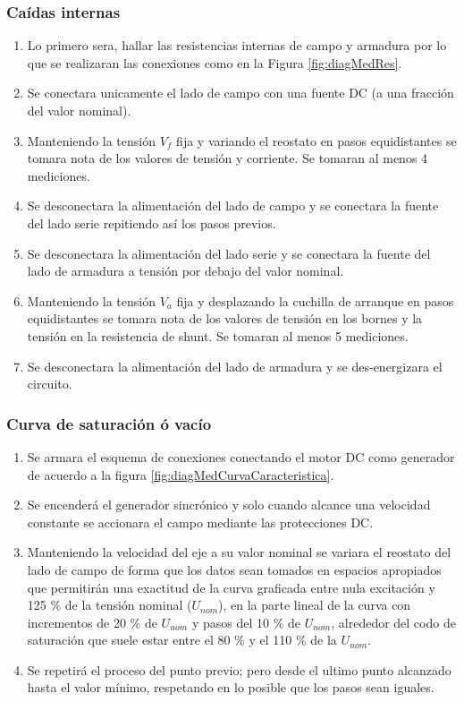 \documentclass[11pt,letterpaper]{article}     %
\begin{document}
\subsubsection{Caídas internas}
\begin{enumerate}
    \item Lo primero sera, hallar las resistencias internas de campo y armadura por lo que se realizaran las conexiones como en la Figura \ref{fig:diagMedRes}.
    \item Se conectara unicamente el lado de campo con una fuente DC (a una fracción del valor nominal).
    \item Manteniendo la tensión $V_{f}$ fija y variando el reostato en pasos equidistantes se tomara nota de los valores de tensión y corriente. Se tomaran al menos 4 mediciones.
    \item Se desconectara la alimentación del lado de campo y se conectara la fuente del lado serie repitiendo así los pasos previos.
    \item Se desconectara la alimentación del lado serie y se conectara la fuente del lado de armadura a tensión por debajo del valor nominal.
    \item Manteniendo la tensión $V_{a}$ fija y desplazando la cuchilla de arranque en pasos equidistantes se tomara nota de los valores de tensión en los bornes y la tensión en la resistencia de shunt. Se tomaran al menos 5 mediciones.
    
    \item Se desconectara la alimentación del lado de armadura y se des-energizara el circuito.
\end{enumerate}
\subsubsection{Curva de saturación ó vacío}
\begin{enumerate}
	\item Se armara el esquema de conexiones conectando el motor DC como generador de acuerdo a la figura \ref{fig:diagMedCurvaCaracteristica}.
	\item Se encenderá el generador sincrónico y solo cuando alcance una velocidad constante se accionara el campo mediante las protecciones DC.
	\item Manteniendo la velocidad del eje a su valor nominal se variara el reostato del lado de campo de forma que los datos sean tomados en espacios apropiados que permitirán una exactitud de la curva graficada entre nula excitación y 125 \% de la tensión nominal ($U_{nom}$), en la parte lineal de la curva con incrementos de 20 \% de $U_{nom}$ y pasos del 10 \% de $U_{nom}$,
	alrededor del codo de saturación que suele estar entre el 80 \% y el 110 \% de la $U_{nom}$.  
	\item Se repetirá el proceso del punto previo; pero desde el ultimo punto alcanzado hasta el valor mínimo, respetando en lo posible que los pasos sean iguales.
\end{enumerate}
\end{document}
